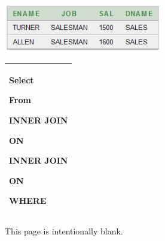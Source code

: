 \begin{center}
  
\includegraphics[width=6.897cm,height=2.081cm]{images/img (40).png}

\end{center}
\begin{flushleft}
\tablefirsthead{}
\tablehead{}
\tabletail{}
\tablelasttail{}
\begin{supertabular}{|m{8.332cm}|}
\hline
Select

From

INNER JOIN

ON

INNER JOIN

ON

WHERE\\\hline
\end{supertabular}
\end{flushleft}

This page is intentionally blank.